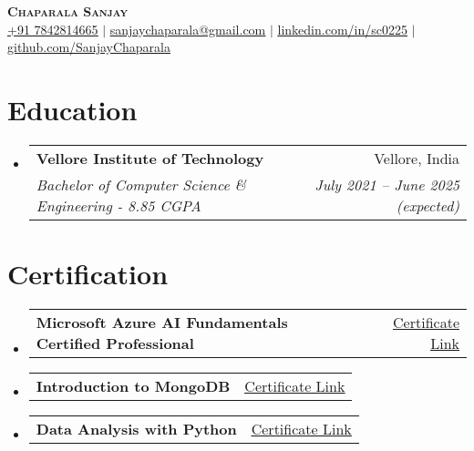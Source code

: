 \documentclass[a4,11pt]{article}
\makeatletter
\newcommand{\resumeSubheading}[4]{
  \vspace{-2pt}\item
    \begin{tabular*}{0.97\textwidth}[t]{l@{\extracolsep{\fill}}r}
      \textbf{#1} & #2 \\
      \textit{\small#3} & \textit{\small #4} \\
    \end{tabular*}\vspace{-7pt}
}
\newcommand{\resumeCertification}[2]{
  \vspace{-2pt}\item
    \begin{tabular*}{0.97\textwidth}[t]{l@{\extracolsep{\fill}}r}
      \textbf{#1} & #2 \\
    \end{tabular*}\vspace{-5pt}
}
\newcommand{\resumeSubHeadingListStart}{\begin{itemize}[leftmargin=0.15in, label={}]}
\newcommand{\resumeSubHeadingListEnd}{\end{itemize}}
\makeatother
\begin{document}

\begin{center}
    \textbf{\Huge \scshape  Chaparala Sanjay} \\ \vspace{1pt}
    \small \href{tel:+91 7842814665}{\underline{+91 7842814665}} $|$ \href{mailto:sanjaychaparala@gmail.com}{\underline{sanjaychaparala@gmail.com}} $|$ 
    \href{https://linkedin.com/in/sc0225/}{\underline{linkedin.com/in/sc0225}} $|$
    \href{https://github.com/SanjayChaparala}{\underline{github.com/SanjayChaparala}}
\end{center}


\section{Education}
  \resumeSubHeadingListStart
    \resumeSubheading
      {Vellore Institute of Technology}{Vellore, India}
      {Bachelor of Computer Science \& Engineering - 8.85 CGPA}{July 2021 -- June 2025 (expected)}
  \resumeSubHeadingListEnd

\section{Certification}
  \resumeSubHeadingListStart
    \resumeCertification
      {Microsoft Azure AI Fundamentals Certified Professional}
      {\href{https://www.credly.com/badges/2e622083-35f1-4c7e-a8ef-6fec9d73fe91}{\underline{Certificate Link}}}

      \resumeCertification
      {Introduction to MongoDB}
      {\href{https://learn.mongodb.com/c/E0PGTBzoRKuwMcHm6oDsIw}{\underline{Certificate Link}}}

      \resumeCertification
      {Data Analysis with Python}
      {\href{https://www.freecodecamp.org/certification/fcc1bc849c1-78b2-4fde-8850-ddfef14e44eb/data-analysis-with-python-v7}{\underline{Certificate Link}}}
  \resumeSubHeadingListEnd
\end{document}

